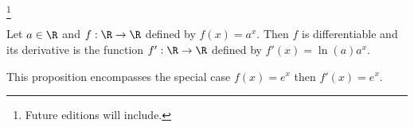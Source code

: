 
\footnote{Future editions will include.}


\begin{proposition}
Let $a \in \R$ and $f: \R \to \R$ defined by $f(x) = a^x$.
Then $f$ is differentiable and its derivative is the function $f': \R \to \R$ defined by $f'(x) = \ln(a)a^x$.
\end{proposition}

This proposition encompasses the special case $f(x) = e^x$ then $f'(x) = e^x$.



\blankpage
